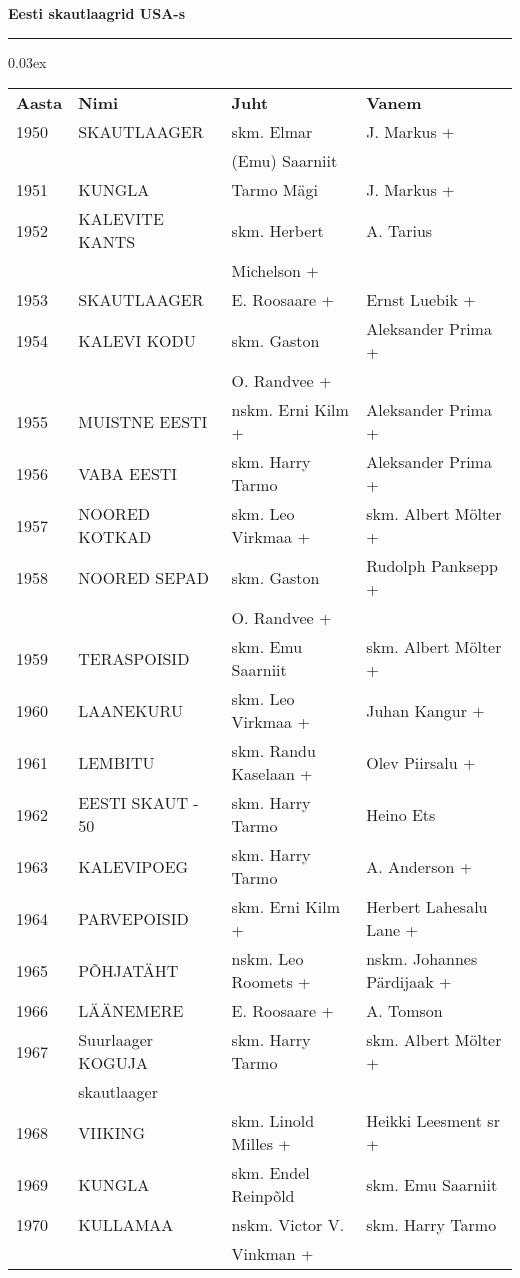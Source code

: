 \documentclass[12pt]{extbook}
\begin{document}
\centerline{ {\bf {\large Eesti  skautlaagrid  USA-s}}}
\vspace{0.1in}
\hrule height 0.05ex
{\centering\scriptsize\arrayrulewidth 0.03ex
\begin{tabular*}{1.0\textwidth}{@{\extracolsep{\fill}}@{}l@{}@{}l@{}@{}l@{}@{}l@{}}
\bf{Aasta}	&	\bf{Nimi}				&	\bf{Juht}				&	\bf{Vanem}\\[2mm]
	1950	&	SKAUTLAAGER				&	skm. Elmar 				&	J. Markus +\\
			&							&	(Emu) Saarniit			&	\\[2mm]
	1951	&	KUNGLA					&	Tarmo M\"agi			&	J. Markus +\\[2mm]
	1952	&	KALEVITE KANTS			&	skm. Herbert 			&	A. Tarius\\
			&							&	Michelson +				&	\\[2mm]
	1953	&	SKAUTLAAGER				&	E. Roosaare +			&	Ernst Luebik +\\[2mm]
	1954	&	KALEVI KODU				&	skm. Gaston 			&	Aleksander Prima +\\
			&							&	O. Randvee +			&	\\[2mm]
	1955	&	MUISTNE EESTI			&	nskm. Erni Kilm +		&	Aleksander Prima +\\[2mm]
	1956	&	VABA EESTI				&	skm. Harry Tarmo		&	Aleksander Prima +\\[2mm]
	1957	&	NOORED KOTKAD			&	skm. Leo Virkmaa +		&	skm. Albert M\"olter +\\[2mm]
	1958	&	NOORED SEPAD			&	skm. Gaston 			&	Rudolph Panksepp +\\
			&							&	O. Randvee +			&	\\[2mm]
	1959	&	TERASPOISID				&	skm. Emu Saarniit		&	skm. Albert M\"olter +\\[2mm]
	1960	&	LAANEKURU				&	skm.  Leo Virkmaa +		&	Juhan Kangur +\\[2mm]
	1961	&	LEMBITU					&	skm. Randu Kaselaan +	&	Olev Piirsalu +\\[2mm]
	1962	&	EESTI SKAUT - 50		&	skm. Harry Tarmo		&	Heino Ets\\[2mm]
	1963	&	KALEVIPOEG				&	skm. Harry Tarmo		&	A. Anderson +\\[2mm]
	1964	&	PARVEPOISID				&	skm. Erni Kilm +		&	Herbert Lahesalu Lane +\\[2mm]
	1965	&	P\~OHJAT\"AHT			&	nskm. Leo Roomets +		&	nskm. Johannes P\"ardijaak +\\[2mm]
	1966	&	L\"A\"ANEMERE			&	E. Roosaare +			&	A. Tomson\\[2mm]
	1967	&	Suurlaager KOGUJA		&	skm. Harry Tarmo		&	skm. Albert M\"olter +\\
			&	skautlaager				&							&	\\[2mm]
	1968	&	VIIKING					&	skm. Linold Milles +	&	Heikki Leesment sr +\\[2mm]
	1969	&	KUNGLA					&	skm. Endel Reinp\~old	&	skm. Emu Saarniit\\[2mm]
	1970	&	KULLAMAA				&	nskm. Victor V. 		&	skm. Harry Tarmo\\
			&							&	Vinkman +				&	\\[2mm]
\end{tabular*}}
\end{document}
